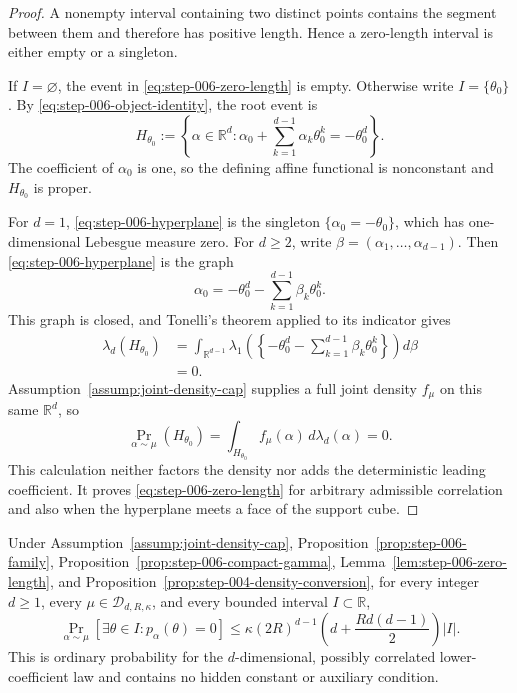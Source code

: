 \begin{proof}
A nonempty interval containing two distinct points contains the segment
between them and therefore has positive length.  Hence a zero-length
interval is either empty or a singleton.

If $I=\varnothing$, the event in \eqref{eq:step-006-zero-length} is empty.
Otherwise write $I=\{\theta_0\}$.  By
\eqref{eq:step-006-object-identity}, the root event is
\begin{equation}
H_{\theta_0}
:=\left\{\alpha\in\mathbb R^d:
\alpha_0+\sum_{k=1}^{d-1}\alpha_k\theta_0^k=-\theta_0^d
\right\}.
\label{eq:step-006-hyperplane}
\end{equation}
The coefficient of $\alpha_0$ is one, so the defining affine functional is
nonconstant and $H_{\theta_0}$ is proper.

For $d=1$, \eqref{eq:step-006-hyperplane} is the singleton
$\{\alpha_0=-\theta_0\}$, which has one-dimensional Lebesgue measure zero.
For $d\geq2$, write
$\beta=(\alpha_1,\ldots,\alpha_{d-1})$.  Then
\eqref{eq:step-006-hyperplane} is the graph
\[
\alpha_0
=-\theta_0^d-\sum_{k=1}^{d-1}\beta_k\theta_0^k.
\]
This graph is closed, and Tonelli's theorem applied to its indicator gives
\begin{equation}
\begin{aligned}
\lambda_d(H_{\theta_0})
&=\int_{\mathbb R^{d-1}}
\lambda_1\!\left(
\left\{-\theta_0^d-
\sum_{k=1}^{d-1}\beta_k\theta_0^k\right\}
\right)d\beta\\
&=0.
\end{aligned}
\label{eq:step-006-hyperplane-nullity}
\end{equation}
Assumption~\ref{assump:joint-density-cap} supplies a full joint density
$f_\mu$ on this same $\mathbb R^d$, so
\[
\Pr_{\alpha\sim\mu}(H_{\theta_0})
=\int_{H_{\theta_0}}f_\mu(\alpha)\,d\lambda_d(\alpha)=0.
\]
This calculation neither factors the density nor adds the deterministic
leading coefficient.  It proves \eqref{eq:step-006-zero-length} for
arbitrary admissible correlation and also when the hyperplane meets a face
of the support cube.
\end{proof}

\begin{proposition}
\label{prop:step-006-monic-bound}
Under Assumption~\ref{assump:joint-density-cap},
Proposition~\ref{prop:step-006-family},
Proposition~\ref{prop:step-006-compact-gamma},
Lemma~\ref{lem:step-006-zero-length}, and
Proposition~\ref{prop:step-004-density-conversion}, for every integer
$d\geq1$, every $\mu\in\mathcal D_{d,R,\kappa}$, and every bounded interval
$I\subset\mathbb R$,
\begin{equation}
\Pr_{\alpha\sim\mu}
[\exists\theta\in I:p_\alpha(\theta)=0]
\leq
\kappa(2R)^{d-1}
\left(d+\frac{Rd(d-1)}2\right)|I|.
\label{eq:step-006-monic-bound}
\end{equation}
This is ordinary probability for the $d$-dimensional, possibly correlated
lower-coefficient law and contains no hidden constant or auxiliary
condition.
\end{proposition}

